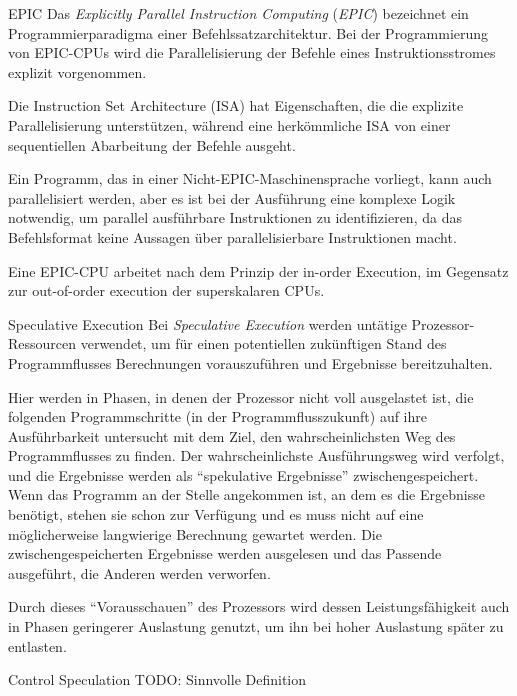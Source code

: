 \begin{defi}[Befehlssatzarchitektur]{EPIC}
    Das \emph{Explicitly Parallel Instruction Computing} (\emph{EPIC}) bezeichnet ein Programmierparadigma einer Befehlssatzarchitektur.
    Bei der Programmierung von EPIC-CPUs wird die Parallelisierung der Befehle eines Instruktionsstromes explizit vorgenommen.

    Die Instruction Set Architecture (ISA) hat Eigenschaften, die die explizite Parallelisierung unterstützen, während eine herkömmliche ISA von einer sequentiellen Abarbeitung der Befehle ausgeht.

    Ein Programm, das in einer Nicht-EPIC-Maschinensprache vorliegt, kann auch parallelisiert werden, aber es ist bei der Ausführung eine komplexe Logik notwendig, um parallel ausführbare Instruktionen zu identifizieren, da das Befehlsformat keine Aussagen über parallelisierbare Instruktionen macht.

    Eine EPIC-CPU arbeitet nach dem Prinzip der in-order Execution, im Gegensatz zur out-of-order execution der superskalaren CPUs.
\end{defi}

\begin{defi}{Speculative Execution}
    Bei \emph{Speculative Execution} werden untätige Prozessor-Ressourcen verwendet, um für einen potentiellen zukünftigen Stand des Programmflusses Berechnungen vorauszuführen und Ergebnisse bereitzuhalten.

    Hier werden in Phasen, in denen der Prozessor nicht voll ausgelastet ist, die folgenden Programmschritte (in der Programmflusszukunft) auf ihre Ausführbarkeit untersucht mit dem Ziel, den wahrscheinlichsten Weg des Programmflusses zu finden.
    Der wahrscheinlichste Ausführungsweg wird verfolgt, und die Ergebnisse werden als \enquote{spekulative Ergebnisse} zwischengespeichert.
    Wenn das Programm an der Stelle angekommen ist, an dem es die Ergebnisse benötigt, stehen sie schon zur Verfügung und es muss nicht auf eine möglicherweise langwierige Berechnung gewartet werden.
    Die zwischengespeicherten Ergebnisse werden ausgelesen und das Passende ausgeführt, die Anderen werden verworfen.

    Durch dieses \enquote{Vorausschauen} des Prozessors wird dessen Leistungsfähigkeit auch in Phasen geringerer Auslastung genutzt, um ihn bei hoher Auslastung später zu entlasten.
\end{defi}

\begin{defi}{Control Speculation}
    TODO: Sinnvolle Definition
\end{defi}

